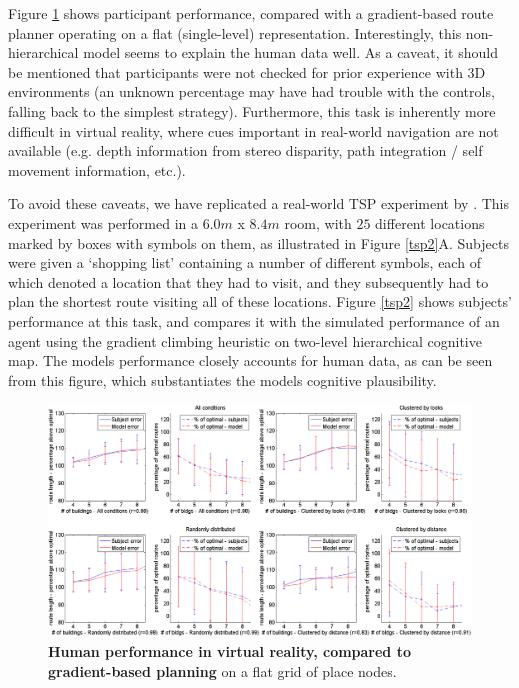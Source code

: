 Figure \ref{tsp} shows participant performance, compared with a gradient-based route planner operating on a flat (single-level) representation. Interestingly, this non-hierarchical model seems to explain the human data well. As a caveat, it should be mentioned that participants were not checked for prior experience with 3D environments (an unknown percentage may have had trouble with the controls, falling back to the simplest strategy). Furthermore, this task is inherently more difficult in virtual reality, where cues important in real-world navigation are not available (e.g. depth information from stereo disparity, path integration / self movement information, etc.).

To avoid these caveats, we have replicated a real-world TSP experiment by \citep{Wiener2009}. This experiment was performed in a $6.0m$ x $8.4m$ room, with $25$ different locations marked by boxes with symbols on them, as illustrated in Figure \ref{tsp2}A. Subjects were given a `shopping list' containing a number of different symbols, each of which denoted a location that they had to visit, and they subsequently had to plan the shortest route visiting all of these locations. Figure \ref{tsp2} shows subjects' performance at this task, and compares it with the simulated performance of an agent using the gradient climbing heuristic on two-level hierarchical cognitive map. The models performance closely  accounts for human data, as  can  be  seen  from  this  figure,  which  substantiates  the  models  cognitive plausibility.


\begin{figure}[!ht]
	\begin{center}
		\includegraphics[width=\textwidth]{img/tsperrors2}
	\end{center}
	\caption[Human performance in virtual reality, compared to gradient-based planning]{
		{\bf Human performance in virtual reality, compared to gradient-based planning} on a flat grid of place nodes. 
	}
	\label{tsp}
\end{figure}

